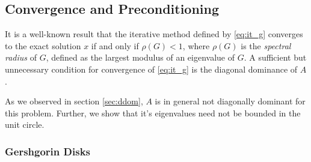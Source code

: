 \documentclass[10pt]{article}
\begin{document}
\begin{multicols}{2}



\subsection{Convergence and Preconditioning}

It is a well-known result \citep{anderson_analysis_2012} that the iterative method defined by \eqref{eq:it_g} converges to the exact solution $x$ if and only if $\rho(G) < 1$, where $\rho(G)$ is the \textit{spectral radius} of $G$, defined as the largest modulus of an eigenvalue of $G$.
A sufficient but unnecessary condition for convergence of \eqref{eq:it_g} is the diagonal dominance of $A$.

As we observed in section \ref{sec:ddom}, $A$ is in general not diagonally dominant for this problem.
Further, we show that it's eigenvalues need not be bounded in the unit circle.

\subsubsection{Gershgorin Disks}


% 


\end{multicols}
\end{document}
